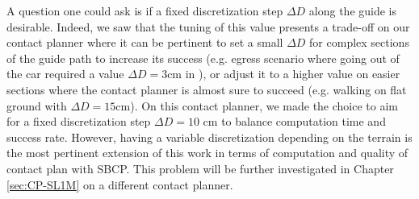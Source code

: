 A question one could ask is if a fixed discretization step $\Delta D$ along the guide is desirable. 
Indeed, we saw that the tuning of this value presents a trade-off on our contact planner where it can be pertinent to set a small $\Delta D$ for complex sections of the guide path to increase its success (e.g. egress scenario where going out of the car required a value $\Delta D=3$cm in \cite{AcyclicCP}), or adjust it to a higher value on easier sections where the contact planner is almost sure to succeed (e.g. walking on flat ground with $\Delta D=15$cm).
On this contact planner, we made the choice to aim for a fixed discretization step $\Delta D=10$ cm to balance computation time and success rate.
However, having a variable discretization depending on the terrain is the most pertinent extension of this work in terms of computation and quality of contact plan with SBCP.
This problem will be further investigated in Chapter \ref{sec:CP-SL1M} on a different contact planner.


